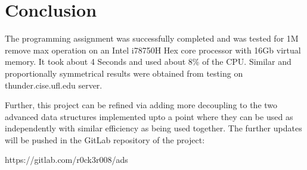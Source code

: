 \documentclass[conference,a4paper,12pt]{IEEEtran}
\begin{document}
\section{Conclusion}
The programming assignment was successfully completed and was tested for 1M remove max operation on an Intel i7\-8750H Hex core processor with 16Gb virtual memory. It took about 4 Seconds and used about 8\% of the CPU. Similar and proportionally symmetrical results were obtained from testing on thunder.cise.ufl.edu server.

Further, this project can be refined via adding more decoupling to the two advanced data structures implemented upto a point where they can be used as independently with similar efficiency as being used together. The further updates will be pushed in the GitLab repository of the project:

\begin{center}
https://gitlab.com/r0ck3r008/ads
\end{center}
\end{document}
